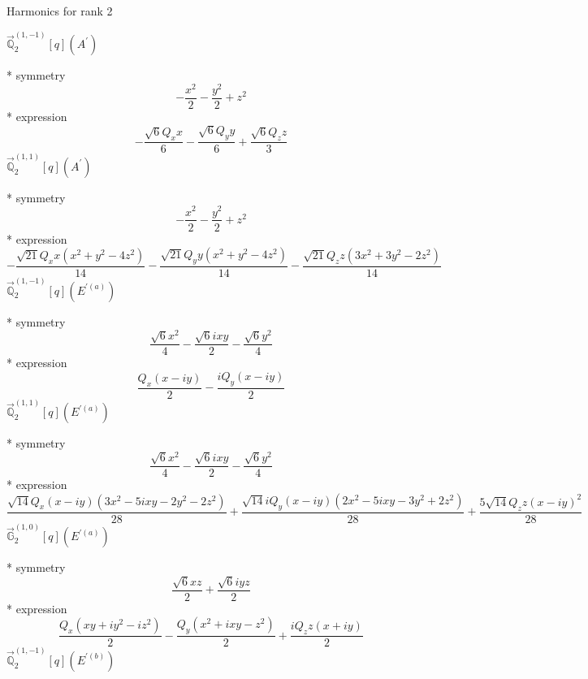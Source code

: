\documentclass[fleqn,8pt]{jsarticle}
\begin{document}
\noindent * Harmonics for rank 2

\noindent\quad $\vec{\mathbb{Q}}_{2}^{(1,-1)}[q](A^{\prime})$

\noindent\quad ** symmetry
\begin{dmath*}
- \frac{x^{2}}{2} - \frac{y^{2}}{2} + z^{2}
\end{dmath*}
\noindent\quad ** expression
\begin{dmath*}
- \frac{\sqrt{6} Q_{x} x}{6} - \frac{\sqrt{6} Q_{y} y}{6} + \frac{\sqrt{6} Q_{z} z}{3}
\end{dmath*}
\noindent\quad $\vec{\mathbb{Q}}_{2}^{(1,1)}[q](A^{\prime})$

\noindent\quad ** symmetry
\begin{dmath*}
- \frac{x^{2}}{2} - \frac{y^{2}}{2} + z^{2}
\end{dmath*}
\noindent\quad ** expression
\begin{dmath*}
- \frac{\sqrt{21} Q_{x} x \left(x^{2} + y^{2} - 4 z^{2}\right)}{14} - \frac{\sqrt{21} Q_{y} y \left(x^{2} + y^{2} - 4 z^{2}\right)}{14} - \frac{\sqrt{21} Q_{z} z \left(3 x^{2} + 3 y^{2} - 2 z^{2}\right)}{14}
\end{dmath*}
\noindent\quad $\vec{\mathbb{Q}}_{2}^{(1,-1)}[q](E^{\prime(a)})$

\noindent\quad ** symmetry
\begin{dmath*}
\frac{\sqrt{6} x^{2}}{4} - \frac{\sqrt{6} i x y}{2} - \frac{\sqrt{6} y^{2}}{4}
\end{dmath*}
\noindent\quad ** expression
\begin{dmath*}
\frac{Q_{x} \left(x - i y\right)}{2} - \frac{i Q_{y} \left(x - i y\right)}{2}
\end{dmath*}
\noindent\quad $\vec{\mathbb{Q}}_{2}^{(1,1)}[q](E^{\prime(a)})$

\noindent\quad ** symmetry
\begin{dmath*}
\frac{\sqrt{6} x^{2}}{4} - \frac{\sqrt{6} i x y}{2} - \frac{\sqrt{6} y^{2}}{4}
\end{dmath*}
\noindent\quad ** expression
\begin{dmath*}
\frac{\sqrt{14} Q_{x} \left(x - i y\right) \left(3 x^{2} - 5 i x y - 2 y^{2} - 2 z^{2}\right)}{28} + \frac{\sqrt{14} i Q_{y} \left(x - i y\right) \left(2 x^{2} - 5 i x y - 3 y^{2} + 2 z^{2}\right)}{28} + \frac{5 \sqrt{14} Q_{z} z \left(x - i y\right)^{2}}{28}
\end{dmath*}
\noindent\quad $\vec{\mathbb{G}}_{2}^{(1,0)}[q](E^{\prime(a)})$

\noindent\quad ** symmetry
\begin{dmath*}
\frac{\sqrt{6} x z}{2} + \frac{\sqrt{6} i y z}{2}
\end{dmath*}
\noindent\quad ** expression
\begin{dmath*}
\frac{Q_{x} \left(x y + i y^{2} - i z^{2}\right)}{2} - \frac{Q_{y} \left(x^{2} + i x y - z^{2}\right)}{2} + \frac{i Q_{z} z \left(x + i y\right)}{2}
\end{dmath*}
\noindent\quad $\vec{\mathbb{Q}}_{2}^{(1,-1)}[q](E^{\prime(b)})$
\end{document}

